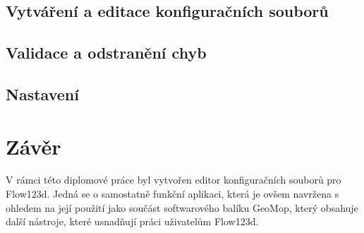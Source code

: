 \documentclass[FM,bw,DP]{tulthesis}
\begin{document}
\section{Vytváření a editace konfiguračních souborů}

\section{Validace a odstranění chyb}

\section{Nastavení} 



%
%
%
%
%
%
%
%
%
%
%
%
%
%


\chapter*{Závěr}
V rámci této diplomové práce byl vytvořen editor konfiguračních souborů pro Flow123d. Jedná se o samostatně funkční aplikaci, která je ovšem navržena s ohledem na její použití jako součást softwarového balíku GeoMop, který obsahuje další nástroje, které usnadňují práci uživatelům Flow123d.
\end{document}
